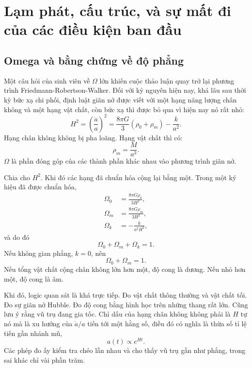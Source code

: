 \chapter{Lạm phát, cấu trúc, và sự mất đi của các điều kiện ban đầu}

\section{Omega và bằng chứng về độ phẳng}

Một câu hỏi của sinh viên về \(\Omega\) lớn khiến cuộc thảo luận quay trở lại phương trình Friedmann-Robertson-Walker. Đối với kỷ nguyên hiện nay, khá lâu sau thời kỳ bức xạ chi phối, định luật giãn nở được viết với một hạng năng lượng chân không và một hạng vật chất, còn bức xạ thì được bỏ qua vì hiện nay nó rất nhỏ:
\begin{equation}
H^2=\left(\frac{\dot a}{a}\right)^2=\frac{8\pi G}{3}\left(\rho_0+\rho_m\right)-\frac{k}{a^2}.
\end{equation}
Hạng chân không không bị pha loãng. Hạng vật chất thì có:
\begin{equation}
\rho_m=\frac{M}{a^3}.
\end{equation}
\(\Omega\) là phần đóng góp của các thành phần khác nhau vào phương trình giãn nở.

Chia cho \(H^2\). Khi đó các hạng đã chuẩn hóa cộng lại bằng một. Trong một ký hiệu đã được chuẩn hóa,
\begin{equation}
\begin{aligned}
\Omega_0&=\frac{8\pi G\rho_0}{3H^2},\\
\Omega_m&=\frac{8\pi G\rho_m}{3H^2},\\
\Omega_k&=-\frac{k}{a^2H^2},
\end{aligned}
\end{equation}
và do đó
\begin{equation}
\Omega_0+\Omega_m+\Omega_k=1.
\end{equation}
Nếu không gian phẳng, \(k=0\), nên
\begin{equation}
\Omega_0+\Omega_m=1.
\end{equation}
Nếu tổng vật chất cộng chân không lớn hơn một, độ cong là dương. Nếu nhỏ hơn một, độ cong là âm.

Khi đó, logic quan sát là khá trực tiếp. Đo vật chất thông thường và vật chất tối. Đo sự giãn nở Hubble. Đo độ cong bằng hình học trên những thang rất lớn. Cũng lưu ý rằng vũ trụ đang gia tốc. Chỉ dấu của hạng chân không không phải là \(H\) tự nó mà là xu hướng của \(\dot a/a\) tiến tới một hằng số, điều đó có nghĩa là thừa số tỉ lệ tiến gần nhánh mũ,
\begin{equation}
a(t)\propto e^{Ht}.
\end{equation}
Các phép đo ấy kiểm tra chéo lẫn nhau và cho thấy vũ trụ gần như phẳng, trong sai khác chỉ vài phần trăm.

